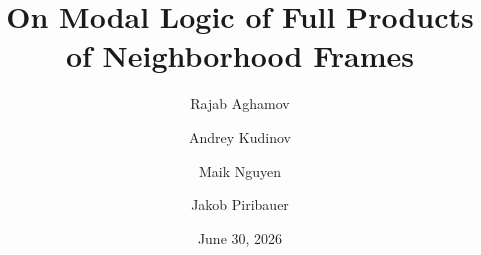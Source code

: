 



\title[On Modal logics of Full Products of Neighborhood Frames]{On Modal Logic of Full Products of Neighborhood Frames}

\author[Maik Thanh Nguyen]{Rajab Aghamov \and  Andrey Kudinov \and Maik Nguyen \and Jakob Piribauer}



\vspace{-2cm}\date{June 30, 2026}
